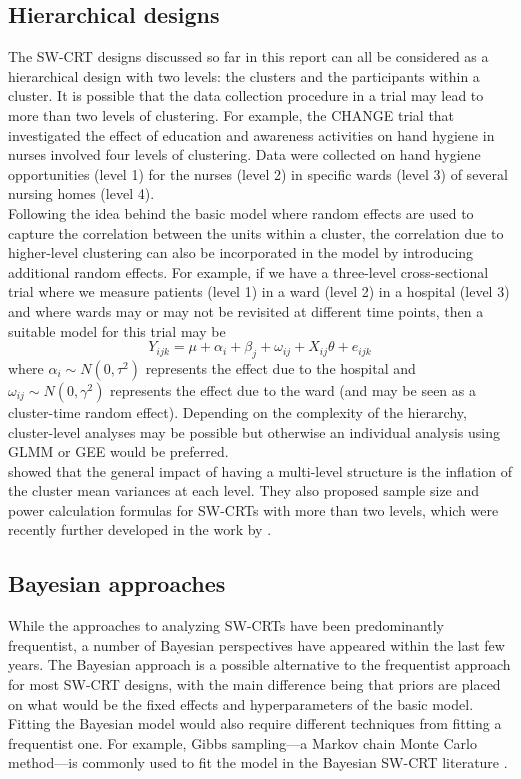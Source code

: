 \documentclass[10pt]{article}
\begin{document}
\subsection{Hierarchical designs}

The SW-CRT designs discussed so far in this report can all be considered as a hierarchical design with two levels: the clusters and the participants within a cluster. It is possible that the data collection procedure in a trial may lead to more than two levels of clustering. For example, the CHANGE trial \parencite{Lescure:2021} that investigated the effect of education and awareness activities on hand hygiene in nurses involved four levels of clustering. Data were collected on hand hygiene opportunities (level 1) for the nurses (level 2) in specific wards (level 3) of several nursing homes (level 4).
\\

Following the idea behind the basic model where random effects are used to capture the correlation between the units within a cluster, the correlation due to higher-level clustering can also be incorporated in the model by introducing additional random effects. For example, if we have a three-level cross-sectional trial where we measure patients (level 1) in a ward (level 2) in a hospital (level 3) and where wards may or may not be revisited at different time points, then a suitable model for this trial may be
\[
Y_{ijk} = \mu + \alpha_i + \beta_j + \omega_{ij} + X_{ij}\theta + e_{ijk}
\]
where $\alpha_i\sim N(0,\tau^2)$ represents the effect due to the hospital and $\omega_{ij}\sim N(0,\gamma^2)$ represents the effect due to the ward (and may be seen as a cluster-time random effect). Depending on the complexity of the hierarchy, cluster-level analyses may be possible but otherwise an individual analysis using GLMM or GEE would be preferred.
\\

\textcite{Teerenstra:2019} showed that the general impact of having a multi-level structure is the inflation of the cluster mean variances at each level. They also proposed sample size and power calculation formulas for SW-CRTs with more than two levels, which were recently further developed in the work by \textcite{DavisPlourde:2021}.

\subsection{Bayesian approaches}

While the approaches to analyzing SW-CRTs have been predominantly frequentist, a number of Bayesian perspectives have appeared within the last few years. The Bayesian approach is a possible alternative to the frequentist approach for most SW-CRT designs, with the main difference being that priors are placed on what would be the fixed effects and hyperparameters of the basic model. Fitting the Bayesian model would also require different techniques from fitting a frequentist one. For example, Gibbs sampling---a Markov chain Monte Carlo method---is commonly used to fit the model in the Bayesian SW-CRT literature \parencite{Cunanan:2016,Zhan:2021}.
\\
\end{document}
